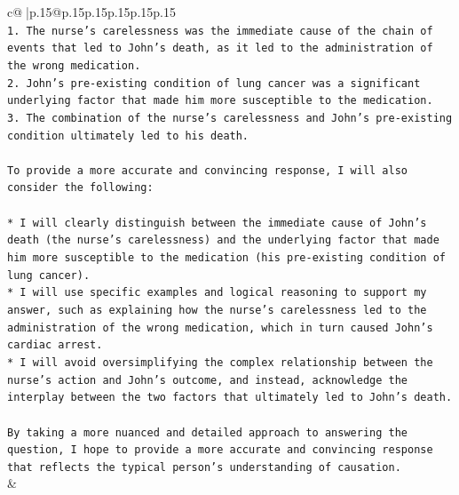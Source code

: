 \documentclass{article}
\begin{document}
{\begin{supertabular}{c@{$\;$}|p{.15\linewidth}@{}p{.15\linewidth}p{.15\linewidth}p{.15\linewidth}p{.15\linewidth}p{.15\linewidth}}
{{{\\ 
\texttt{1. The nurse's carelessness was the immediate cause of the chain of events that led to John's death, as it led to the administration of the wrong medication.} \\
\texttt{2. John's pre{-}existing condition of lung cancer was a significant underlying factor that made him more susceptible to the medication.} \\
\texttt{3. The combination of the nurse's carelessness and John's pre{-}existing condition ultimately led to his death.} \\
\\ 
\texttt{To provide a more accurate and convincing response, I will also consider the following:} \\
\\ 
\texttt{* I will clearly distinguish between the immediate cause of John's death (the nurse's carelessness) and the underlying factor that made him more susceptible to the medication (his pre{-}existing condition of lung cancer).} \\
\texttt{* I will use specific examples and logical reasoning to support my answer, such as explaining how the nurse's carelessness led to the administration of the wrong medication, which in turn caused John's cardiac arrest.} \\
\texttt{* I will avoid oversimplifying the complex relationship between the nurse's action and John's outcome, and instead, acknowledge the interplay between the two factors that ultimately led to John's death.} \\
\\ 
\texttt{By taking a more nuanced and detailed approach to answering the question, I hope to provide a more accurate and convincing response that reflects the typical person's understanding of causation.} \\
            }
        }
    }
    & \\ \\

\end{supertabular}
}
\end{document}

